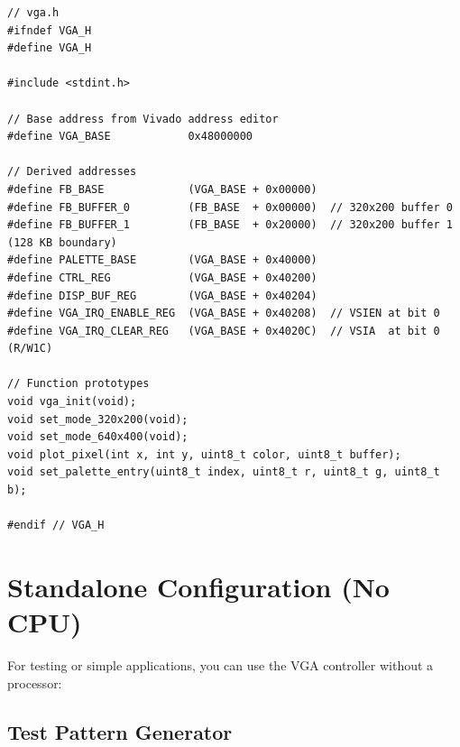 \documentclass[11pt,letterpaper]{report}
\begin{document}
\begin{lstlisting}[style=c,caption={MicroBlaze Software Header}]
// vga.h
#ifndef VGA_H
#define VGA_H

#include <stdint.h>

// Base address from Vivado address editor
#define VGA_BASE            0x48000000

// Derived addresses
#define FB_BASE             (VGA_BASE + 0x00000)
#define FB_BUFFER_0         (FB_BASE  + 0x00000)  // 320x200 buffer 0
#define FB_BUFFER_1         (FB_BASE  + 0x20000)  // 320x200 buffer 1 (128 KB boundary)
#define PALETTE_BASE        (VGA_BASE + 0x40000)
#define CTRL_REG            (VGA_BASE + 0x40200)
#define DISP_BUF_REG        (VGA_BASE + 0x40204)
#define VGA_IRQ_ENABLE_REG  (VGA_BASE + 0x40208)  // VSIEN at bit 0
#define VGA_IRQ_CLEAR_REG   (VGA_BASE + 0x4020C)  // VSIA  at bit 0 (R/W1C)

// Function prototypes
void vga_init(void);
void set_mode_320x200(void);
void set_mode_640x400(void);
void plot_pixel(int x, int y, uint8_t color, uint8_t buffer);
void set_palette_entry(uint8_t index, uint8_t r, uint8_t g, uint8_t b);

#endif // VGA_H
\end{lstlisting}

\section{Standalone Configuration (No CPU)}

For testing or simple applications, you can use the VGA controller without a processor:

\subsection{Test Pattern Generator}
\end{document}
